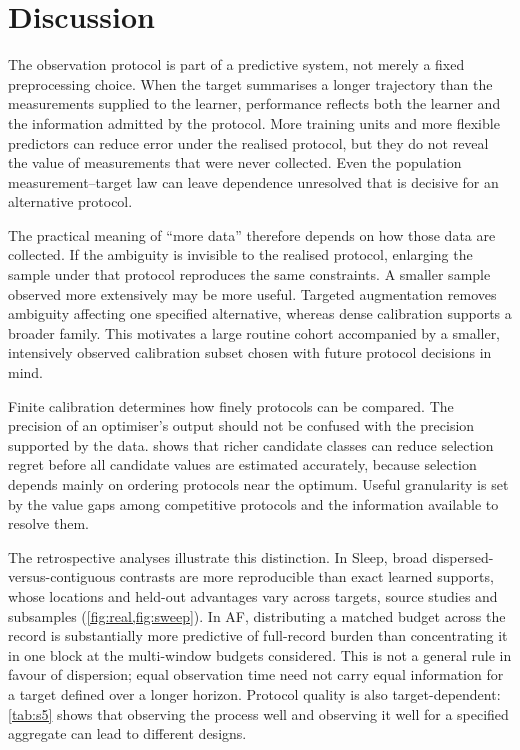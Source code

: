 \section{Discussion}
The observation protocol is part of a predictive system, not merely a fixed
preprocessing choice. When the target summarises a longer trajectory than the
measurements supplied to the learner, performance reflects both the learner
and the information admitted by the protocol. More training units and more
flexible predictors can reduce error under the realised protocol, but they do
not reveal the value of measurements that were never collected. Even the
population measurement--target law can leave dependence unresolved that is
decisive for an alternative protocol.

The practical meaning of ``more data'' therefore depends on how those data are
collected. If the ambiguity is invisible to the realised protocol, enlarging
the sample under that protocol reproduces the same constraints. A smaller
sample observed more extensively may be more useful. Targeted augmentation
removes ambiguity affecting one specified alternative, whereas dense
calibration supports a broader family. This motivates a large routine cohort
accompanied by a smaller, intensively observed calibration subset chosen with
future protocol decisions in mind.

Finite calibration determines how finely protocols can be compared. The
precision of an optimiser's output should not be confused with the precision
supported by the data.  shows that richer candidate
classes can reduce selection regret before all candidate values are estimated
accurately, because selection depends mainly on ordering protocols near the
optimum. Useful granularity is set by the value gaps among competitive
protocols and the information available to resolve them.

The retrospective analyses illustrate this distinction. In Sleep, broad
dispersed-versus-contiguous contrasts are more reproducible than exact learned
supports, whose locations and held-out advantages vary across targets, source
studies and subsamples (\cref{fig:real,fig:sweep}). In AF, distributing a
matched budget across the record is substantially more predictive of
full-record burden than concentrating it in one block at the multi-window
budgets considered. This is not a general rule in favour of dispersion; equal
observation time need not carry equal information for a target defined over a
longer horizon. Protocol quality is also target-dependent: \cref{tab:s5}
shows that observing the process well and observing it well for a specified
aggregate can lead to different designs.

